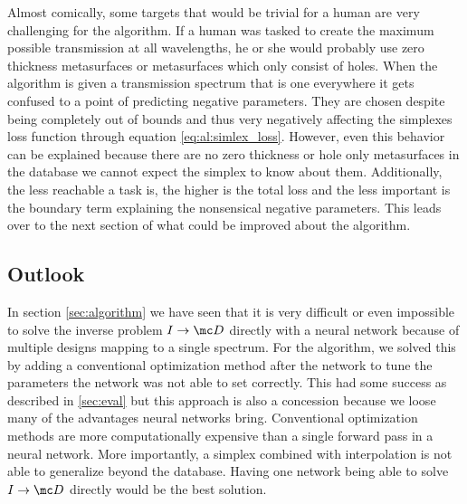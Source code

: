 \indent
Almost comically, some targets that would be trivial for a human are very challenging for the algorithm. If a human was tasked to create the maximum possible transmission at all wavelengths, he or she would probably use zero thickness metasurfaces or metasurfaces which only consist of holes. When the algorithm is given a transmission spectrum that is one everywhere it gets confused to a point of predicting negative parameters.
They are chosen despite being completely out of bounds and thus very negatively affecting the simplexes loss function through equation \eqref{eq:al:simlex_loss}.
However, even this behavior can be explained because there are no zero thickness or hole only metasurfaces in the database we cannot expect the simplex to know about them.
Additionally, the less reachable a task is, the higher is the total loss and the less important is the boundary term explaining the nonsensical negative parameters. This leads over to the next section of what could be improved about the algorithm.
\newpage

\subsection{Outlook}\label{sec:outlook}
In section \ref{sec:algorithm} we have seen that it is very difficult or even impossible to solve the inverse problem $I \rightarrow \mc D$ directly with a neural network because of multiple designs mapping to a single spectrum.
For the algorithm, we solved this by adding a conventional optimization method after the network to tune the parameters the network was not able to set correctly.
This had some success as described in \ref{sec:eval}  but this approach is also a concession because we loose many of the advantages neural networks bring. Conventional optimization methods are more computationally expensive than a single forward pass in a neural network.
More importantly, a simplex combined with interpolation is not able to generalize beyond the database.
Having one network being able to solve $I \rightarrow \mc D$ directly would be the best solution.
\\

